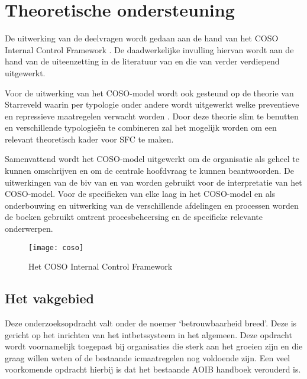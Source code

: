 \newpage
\section{Theoretische ondersteuning}
\label{hoofdstuk:theoretischeondersteuning}
De uitwerking van de deelvragen wordt gedaan aan de hand van het COSO Internal Control Framework \citep{COSOsummery}. De daadwerkelijke invulling hiervan wordt aan de hand van de uiteenzetting in de literatuur van \citet{bivpraktijk} en die van \citet{bivperspectief} verder verdiepend uitgewerkt. 

Voor de uitwerking van het COSO-model wordt ook gesteund op de theorie van Starreveld waarin per \gls{typologie} onder andere wordt uitgewerkt welke preventieve en repressieve maatregelen verwacht worden \citep{jans,financiering,buunk}. Door deze theorie slim te benutten en verschillende typologieën te combineren zal het mogelijk worden om een relevant theoretisch kader voor SFC te maken. 

Samenvattend wordt het COSO-model uitgewerkt om de organisatie als geheel te kunnen omschrijven en om de centrale hoofdvraag te kunnen beantwoorden. De uitwerkingen van de \gls{biv} van \citet{bivperspectief} en van \citet{bivpraktijk} worden gebruikt voor de interpretatie van het COSO-model. Voor de specifieken van elke laag in het COSO-model en als onderbouwing en uitwerking van de verschillende afdelingen en processen worden de boeken gebruikt omtrent procesbeheersing en de specifieke relevante onderwerpen. \citep{internebeheersing,jans,financiering,buunk}

\begin{figure}[!h]
    \centering
    \texttt{[image: coso]}
    \caption{Het COSO Internal Control Framework \citep{COSOsummery}}
    \label{fig:coso}
\end{figure}

\subsection{Het vakgebied}
Deze onderzoeksopdracht valt onder de noemer `betrouwbaarheid breed'. Deze is gericht op het inrichten van het \gls{intbet}ssysteem in het algemeen. Deze opdracht wordt voornamelijk toegepast bij organisaties die sterk aan het groeien zijn en die graag willen weten of de bestaande \gls{ic}maatregelen nog voldoende zijn. Een veel voorkomende opdracht hierbij is dat het bestaande AOIB handboek verouderd is. \citep{bivpraktijk}


\newpage
